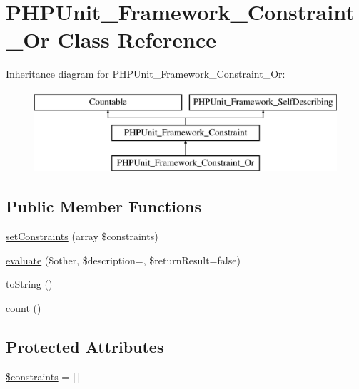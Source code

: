 \hypertarget{class_p_h_p_unit___framework___constraint___or}{}\section{P\+H\+P\+Unit\+\_\+\+Framework\+\_\+\+Constraint\+\_\+\+Or Class Reference}
\label{class_p_h_p_unit___framework___constraint___or}
Inheritance diagram for P\+H\+P\+Unit\+\_\+\+Framework\+\_\+\+Constraint\+\_\+\+Or\+:\begin{figure}[H]
\begin{center}
\leavevmode
\includegraphics[height=3.000000cm]{class_p_h_p_unit___framework___constraint___or}
\end{center}
\end{figure}
\subsection*{Public Member Functions}
\begin{DoxyCompactItemize}
\item 
\mbox{\hyperlink{class_p_h_p_unit___framework___constraint___or_aecb273becbedcf46aedb2d32075ae564}{set\+Constraints}} (array \$constraints)
\item 
\mbox{\hyperlink{class_p_h_p_unit___framework___constraint___or_a4c184790087f7d42c3daf0d0180fe5fb}{evaluate}} (\$other, \$description=\textquotesingle{}\textquotesingle{}, \$return\+Result=false)
\item 
\mbox{\hyperlink{class_p_h_p_unit___framework___constraint___or_a5558c5d549f41597377fa1ea8a1cefa3}{to\+String}} ()
\item 
\mbox{\hyperlink{class_p_h_p_unit___framework___constraint___or_ac751e87b3d4c4bf2feb03bee8b092755}{count}} ()
\end{DoxyCompactItemize}
\subsection*{Protected Attributes}
\begin{DoxyCompactItemize}
\item 
\mbox{\hyperlink{class_p_h_p_unit___framework___constraint___or_a9f4fd8838aaef9b57d3fac0dbf9a7929}{\$constraints}} = \mbox{[}$\,$\mbox{]}
\end{DoxyCompactItemize}
